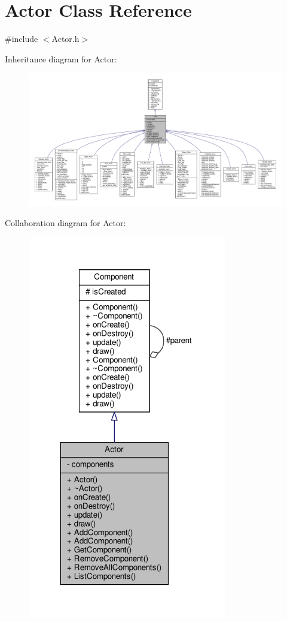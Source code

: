 \hypertarget{classActor}{}\section{Actor Class Reference}
\label{classActor}


{\ttfamily \#include $<$Actor.\+h$>$}



Inheritance diagram for Actor\+:
\nopagebreak
\begin{figure}[H]
\begin{center}
\leavevmode
\includegraphics[width=350pt]{classActor__inherit__graph}
\end{center}
\end{figure}


Collaboration diagram for Actor\+:
\nopagebreak
\begin{figure}[H]
\begin{center}
\leavevmode
\includegraphics[width=246pt]{classActor__coll__graph}
\end{center}
\end{figure}
